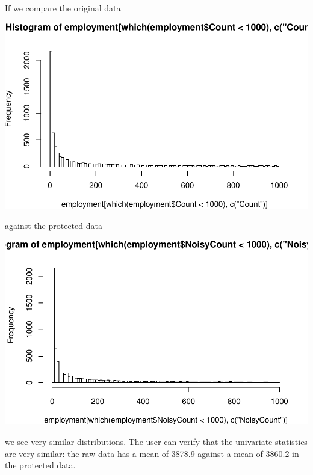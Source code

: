 \documentclass[]{article}
\begin{document}
If we compare the original data

\includegraphics{rampdist_files/figure-latex/unnamed-chunk-6-1.pdf}

against the protected data

\includegraphics{rampdist_files/figure-latex/unnamed-chunk-7-1.pdf}

we see very similar distributions. The user can verify that the
univariate statistics are very similar: the raw data has a mean of
3878.9 against a mean of 3860.2 in the protected data.
\end{document}
